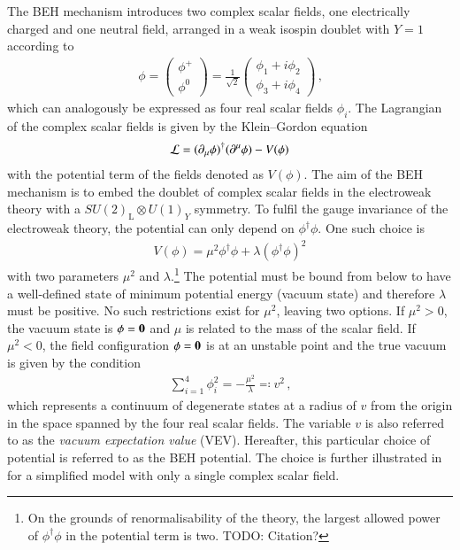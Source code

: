 The BEH mechanism introduces two complex scalar fields, one electrically charged
and one neutral field, arranged in a weak isospin doublet with $Y = 1$ according
to
\begin{align*}
  \phi =
  \begin{pmatrix}
    \phi^+ \\
    \phi^0
  \end{pmatrix}
  = \frac{1}{\sqrt{2}}
  \begin{pmatrix}
    \phi_1 + i \phi_2 \\
    \phi_3 + i \phi_4
  \end{pmatrix} \,\text{,}
\end{align*}
which can analogously be expressed as four real scalar fields $\phi_i$. The
Lagrangian of the complex scalar fields is given by the Klein--Gordon equation
\begin{align*}
  \mathcal{L} = (\partial_\mu \phi)^\dagger (\partial^\mu \phi) - V(\phi)
\end{align*}
with the potential term of the fields denoted as $V(\phi)$. The aim of the BEH
mechanism is to embed the doublet of complex scalar fields in the electroweak
theory with a $SU(2)_{\text{L}}\otimes U(1)_Y$ symmetry. To fulfil the gauge
invariance of the electroweak theory, the potential can only depend on
$\phi^\dagger \phi$. One such choice is
\begin{align}
  V(\phi) = \mu^2 \phi^\dagger \phi + \lambda (\phi^\dagger \phi)^2
  \label{eq:higgs_potential}
\end{align}
with two parameters $\mu^2$ and $\lambda$.\footnote{On the grounds of
  renormalisability of the theory, the largest allowed power of
  $\phi^\dagger \phi$ in the potential term is two. TODO: Citation?} The
potential must be bound from below to have a well-defined state of minimum
potential energy (vacuum state) and therefore $\lambda$ must be positive. No
such restrictions exist for $\mu^2$, leaving two options. If $\mu^2 > 0$, the
vacuum state is $\phi = \myvec{0}$ and $\mu$ is related to the mass of the
scalar field. If $\mu^2 < 0$, the field configuration $\phi = \myvec{0}$ is at
an unstable point and the true vacuum is given by the condition
\begin{align*}
  \sum_{i = 1}^4 \phi_i^2 = -\frac{\mu^2}{\lambda} \eqqcolon v^2 \,\text{,}
\end{align*}
which represents a continuum of degenerate states at a radius of $v$ from the
origin in the space spanned by the four real scalar fields. The variable $v$ is
also referred to as the \emph{vacuum expectation value} (VEV). Hereafter, this
particular choice of potential is referred to as the BEH potential. The choice
is further illustrated in  for a simplified model with
only a single complex scalar field.

